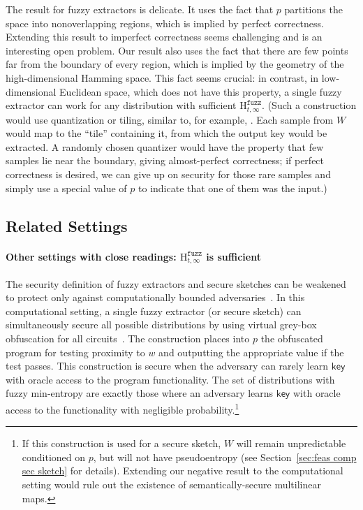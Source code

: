 \documentclass[11pt]{article}
\newcommand{\secref}[1]{\mbox{Section~\ref{#1}}}
\newcommand{\class}[1]{{\ensuremath{\mathsf{#1}}}}
\newcommand{\key}{\ensuremath{\class{key}}\xspace}
\newcommand{\Hfuzz}{\mathrm{H}^{\mathtt{fuzz}}_{t,\infty}}
\begin{document}
The result for fuzzy extractors is delicate.  It uses the fact that $p$ partitions the space into nonoverlapping regions, which is implied by perfect correctness.  Extending this result to imperfect correctness seems challenging and is an interesting open problem. Our result also uses the fact that there are few points far from the boundary of every region, which is implied by the geometry of  the high-dimensional Hamming space.  This fact seems crucial: in contrast, in low-dimensional Euclidean space, which does not have this property, a single fuzzy extractor can work for any distribution with sufficient $\Hfuzz$. (Such a construction would use quantization or tiling, similar to, for example, \cite{CK03,LT03,CZC04,LC06,BDHTV10,VTOSS10}.  Each sample from $W$ would map to the ``tile'' containing it, from which the output key would be extracted. A randomly chosen quantizer would have the property that few samples lie near the boundary, giving almost-perfect correctness; if perfect correctness is desired, we can give up on security for those rare samples and simply use a special value of $p$ to indicate that one of them was the input.)

\subsection{Related Settings}
\label{sec:related settings}
\paragraph{Other settings with close readings:  $\Hfuzz$ is sufficient}
The security definition of fuzzy extractors and secure sketches can be weakened to protect only against computationally bounded adversaries~\cite{fuller2013computational}.   In this computational setting, a single fuzzy extractor (or secure sketch) can simultaneously secure all possible distributions by using virtual grey-box obfuscation for all circuits~\cite{BitanskyCKP14}. The construction places into $p$ the obfuscated program for testing proximity to $w$ and outputting the appropriate value if the test passes.  This construction is secure when the adversary can rarely learn \key with oracle access to the program functionality.  The set of distributions with fuzzy min-entropy are exactly those where an adversary learns \key with oracle access to the functionality with negligible probability.\footnote{If this construction is used for a secure sketch, $W$ will remain unpredictable conditioned on $p$, but will not have pseudoentropy (see  \secref{sec:feas comp sec sketch} for details).  Extending our negative result to the computational setting would rule out the existence of semantically-secure multilinear maps.}
\end{document}
